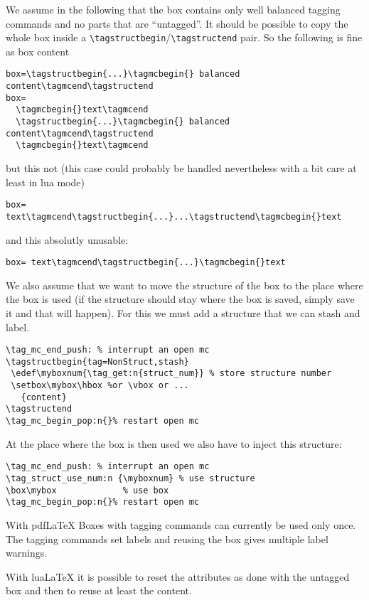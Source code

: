 \documentclass{article}
\begin{document}
We assume in the following that the box contains only well balanced tagging commands and no parts that are \enquote{untagged}. It should be possible to copy the whole box inside a 
\verb+\tagstructbegin+/\verb+\tagstructend+ pair. So the following is fine as box content
\begin{verbatim}
box=\tagstructbegin{...}\tagmcbegin{} balanced content\tagmcend\tagstructend
box=
  \tagmcbegin{}text\tagmcend 
  \tagstructbegin{...}\tagmcbegin{} balanced content\tagmcend\tagstructend
  \tagmcbegin{}text\tagmcend 
\end{verbatim} 
but this not (this case could probably be handled nevertheless with a bit care at least in lua mode)
\begin{verbatim}
box= text\tagmcend\tagstructbegin{...}...\tagstructend\tagmcbegin{}text
\end{verbatim}
and this absolutly unusable:
\begin{verbatim}
box= text\tagmcend\tagstructbegin{...}\tagmcbegin{}text
\end{verbatim}

We also assume that we want to move the structure of the box to the place where the box is used (if the
structure should stay where the box is saved, simply save it and that will happen).
For this we must add a structure that we can stash and label. 

\begin{verbatim}
\tag_mc_end_push: % interrupt an open mc
\tagstructbegin{tag=NonStruct,stash}
 \edef\myboxnum{\tag_get:n{struct_num}} % store structure number
 \setbox\mybox\hbox %or \vbox or ...
   {content}
\tagstructend
\tag_mc_begin_pop:n{}% restart open mc
\end{verbatim}

At the place where the box is then used we also have to inject this structure:

\begin{verbatim}
\tag_mc_end_push: % interrupt an open mc
\tag_struct_use_num:n {\myboxnum} % use structure
\box\mybox             % use box   
\tag_mc_begin_pop:n{}% restart open mc
\end{verbatim}

With pdf\LaTeX{} Boxes with tagging commands can currently be used only once. The tagging commands set labels
and reusing the box gives multiple label warnings.

With lua\LaTeX{} it is possible to reset the attributes as done with the untagged box and then to reuse at least
the content. 
\end{document}

